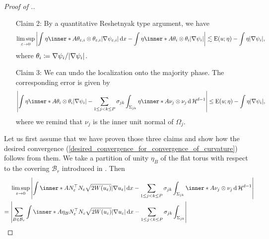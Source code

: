 \begin{proof}[Proof of .]
\begin{itemize}[wide=0pt]
		\item[Claim 2:]
		By a quantitative Reshetnyak type argument, we have
		\begin{equation*}
			\limsup_{ \varepsilon \to 0 }
			\abs{
				\int
				\eta \inner*{ A }{ \theta_{ \varepsilon, i } \otimes \theta_{ 
						\varepsilon,  i } }
				\abs{ \nabla \psi_{ \varepsilon,  i } }
				\dd{ x }
				-
				\int
				\eta \inner*{ A }{ \theta_{ i }  \otimes 
					\theta_{ i } }
				\abs{ \nabla \psi_{ i } }
			}
			\lesssim
			\energy ( u ; \eta ) - \int \eta \abs{ \nabla \psi_{ i } },
		\end{equation*}
		where $ \theta_{ i } \coloneqq \nabla \psi_{ i } / \abs{ \nabla \psi_{ 
				i } } $.
		\item[Claim 3:] 
		We can undo the localization onto the majority phase. The corresponding 
		error is given by
		\begin{equation*}
			\abs{ 
				\int
				\eta
				\inner*{ A }{ \theta_{ i } \otimes \theta_{ i } }
				\abs{ \nabla \psi_{ i } }
				-
				\sum_{ 1 \leq j < k \leq P }
				\sigma_{ j k }
				\int_{ \Sigma_{ j k } }
				\eta 
				\inner*{ A }{ \nu_{ j } \otimes \nu_{ j } }
				\dd{ \hm^{ d - 1 } }
			}
			\leq
			\energy ( u ; \eta ) - \int \eta \abs{ \nabla \psi_{ i } },
		\end{equation*}
		where we remind that $ \nu_{ j } $ is the inner unit normal of $ 
		\Omega_{ j } $.
	\end{itemize}
	Let us first assume that we have proven those three claims and show how the 
	desired convergence 
	(\ref{desired_convergence_for_convergence_of_curvature}) follows from them. 
	We take a partition of unity $ \eta_{ B } $ of the flat torus with respect 
	to the covering $ \mathcal{ B }_{ r } $ introduced in 
	. Then
	\begin{align*}
		& \limsup_{ \varepsilon \to 0 }
		\abs{
			\int
			\inner*{ A }{ N_{ \varepsilon }^{ \top } N_{ \varepsilon } }
			\sqrt{ 2 W ( u_{ \varepsilon } ) }
			\abs{ \nabla u_{ \varepsilon } }
			\dd{ x }
			-
			\sum_{ 1 \leq j < k \leq P }
			\sigma_{ j  k }
			\int_{ \Sigma_{ j k } }
			\inner*{ A }{ \nu_{ j } \otimes \nu_{ j } }
			\dd{ \hm^{ d - 1 } }
		} 
		\\
		={} &
		\abs{ 
			\sum_{ B \in \mathcal{ B }_{ r } }
			\int
			\inner*{ A \eta_{ B } }
			{ N_{ \varepsilon }^{ \top } N_{ \varepsilon } }
			\sqrt{ 2 W ( u_{ \varepsilon } ) } \abs{ \nabla u_{ \varepsilon } }
			\dd{ x }
			-
			\sum_{ 1 \leq j < k \leq P }
			\sigma_{ j k }
			\int_{ \Sigma_{ j k } }
}
\end{align*}
\end{proof}
